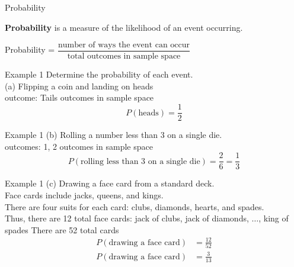 \documentclass[t]{beamer}
\begin{document}
\begin{frame}{Probability}
\begin{tcolorbox}[colframe=green!20!black, colback = green!30!white,title=\textbf{Probability}]
\textbf{Probability} is a measure of the likelihood of an event occurring.
\end{tcolorbox}
\vspace{6pt} \pause
\begin{center}
Probability = $\dfrac{\text{number of ways the event can occur}}{\text{total outcomes in sample space}}$
\end{center}
\end{frame}

\begin{frame}{Example 1}
Determine the probability of each event.	\newline\\
(a)	\quad	Flipping a coin and landing on heads \newline\\	 outcome: Tails	\quad {} outcomes in sample space \pause
\[P(\text{heads}) = \frac{1}{2}\]
\end{frame}

\begin{frame}{Example 1}
(b)	\quad Rolling a number less than 3 on a single die.	\newline\\	 outcomes: 1, 2	\quad	{} outcomes in sample space \pause
\[P(\text{rolling less than 3 on a single die}) = \frac{2}{6} = \frac{1}{3} \]
\end{frame}

\begin{frame}{Example 1}
(c)	\quad	Drawing a face card from a standard deck.	\newline\\	\pause
Face cards include jacks, queens, and kings. \newline\\	\pause
There are four suits for each card: clubs, diamonds, hearts, and spades.	\newline\\	\pause
Thus, there are 12 total face cards: jack of clubs, jack of diamonds, $\dots$, king of spades	\quad \pause There are 52 total cards	\pause
\begin{align*}
P(\text{drawing a face card}) &= \frac{12}{52} \\[6pt]	
P(\text{drawing a face card}) &= \frac{3}{13}
\end{align*}
\end{frame}
\end{document}
